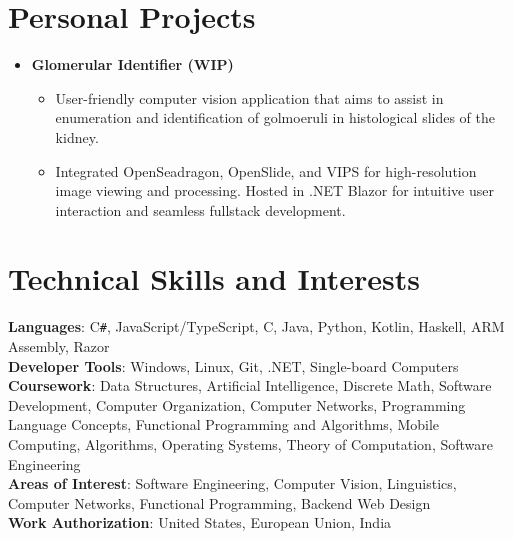 \documentclass[a4paper,11pt]{article}
\newcommand{\resumeSubHeadingListStart}{\begin{itemize}[leftmargin=*,labelsep=0mm]}
\newcommand{\resumeItemListStart}{\begin{justify}\begin{itemize}[leftmargin=3ex, rightmargin=2ex, noitemsep,labelsep=1.2mm,itemsep=0mm]\small}
\newcommand{\resumeSubHeadingListEnd}{\end{itemize}\vspace{2mm}}
\newcommand{\resumeItemListEnd}{\end{itemize} \end{justify}\vspace{-2mm}}
\begin{document}
\section{\textbf{Personal Projects}}
\resumeSubHeadingListStart

    
    
    \item{\textbf{Glomerular Identifier (WIP)}}
      \resumeItemListStart
      \vspace{-3mm}
      \item{User-friendly computer vision application that aims to assist in enumeration and identification of golmoeruli in histological slides of the kidney.}
      \item {Integrated OpenSeadragon, OpenSlide, and VIPS for high-resolution image viewing and processing. Hosted in .NET Blazor for intuitive user interaction and seamless fullstack development.}
      \resumeItemListEnd
    \vspace{-2mm}
    
      
  \resumeSubHeadingListEnd
\vspace{-5.5mm}



\section{\textbf{Technical Skills and Interests}}
 \begin{itemize}[leftmargin=0.05in, label={}]
    \small{\item{
     \textbf{Languages}{: C\texttt{\#}, JavaScript/TypeScript, C, Java, Python, Kotlin, Haskell, ARM Assembly, Razor } \\
       \textbf{Developer Tools}{: Windows, Linux, Git, .NET, Single-board Computers } \\

     \textbf{Coursework}{: Data Structures, Artificial Intelligence, Discrete Math, Software Development, Computer Organization, Computer Networks, Programming Language Concepts, Functional Programming and Algorithms, Mobile Computing, Algorithms, Operating Systems, Theory of Computation, Software Engineering} \\
     
     \textbf{Areas of Interest}{: Software Engineering, Computer Vision, Linguistics, Computer Networks, Functional Programming, Backend Web Design } \\
     \textbf{Work Authorization}{: United States, European Union, India } \\
    }}
 \end{itemize}
 \vspace{-16pt}
\end{document}

